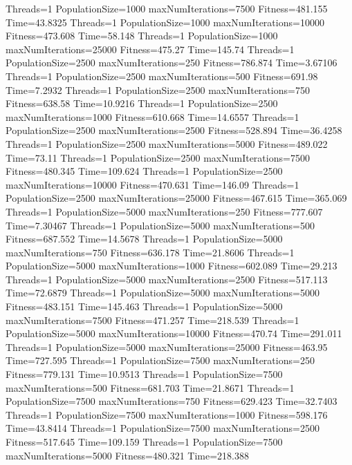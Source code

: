 \documentclass[10pt,letterpaper]{article}
\begin{document}
Threads=1 PopulationSize=1000 maxNumIterations=7500 Fitness=481.155 Time=43.8325
Threads=1 PopulationSize=1000 maxNumIterations=10000 Fitness=473.608 Time=58.148
Threads=1 PopulationSize=1000 maxNumIterations=25000 Fitness=475.27 Time=145.74
Threads=1 PopulationSize=2500 maxNumIterations=250 Fitness=786.874 Time=3.67106
Threads=1 PopulationSize=2500 maxNumIterations=500 Fitness=691.98 Time=7.2932
Threads=1 PopulationSize=2500 maxNumIterations=750 Fitness=638.58 Time=10.9216
Threads=1 PopulationSize=2500 maxNumIterations=1000 Fitness=610.668 Time=14.6557
Threads=1 PopulationSize=2500 maxNumIterations=2500 Fitness=528.894 Time=36.4258
Threads=1 PopulationSize=2500 maxNumIterations=5000 Fitness=489.022 Time=73.11
Threads=1 PopulationSize=2500 maxNumIterations=7500 Fitness=480.345 Time=109.624
Threads=1 PopulationSize=2500 maxNumIterations=10000 Fitness=470.631 Time=146.09
Threads=1 PopulationSize=2500 maxNumIterations=25000 Fitness=467.615 Time=365.069
Threads=1 PopulationSize=5000 maxNumIterations=250 Fitness=777.607 Time=7.30467
Threads=1 PopulationSize=5000 maxNumIterations=500 Fitness=687.552 Time=14.5678
Threads=1 PopulationSize=5000 maxNumIterations=750 Fitness=636.178 Time=21.8606
Threads=1 PopulationSize=5000 maxNumIterations=1000 Fitness=602.089 Time=29.213
Threads=1 PopulationSize=5000 maxNumIterations=2500 Fitness=517.113 Time=72.6879
Threads=1 PopulationSize=5000 maxNumIterations=5000 Fitness=483.151 Time=145.463
Threads=1 PopulationSize=5000 maxNumIterations=7500 Fitness=471.257 Time=218.539
Threads=1 PopulationSize=5000 maxNumIterations=10000 Fitness=470.74 Time=291.011
Threads=1 PopulationSize=5000 maxNumIterations=25000 Fitness=463.95 Time=727.595
Threads=1 PopulationSize=7500 maxNumIterations=250 Fitness=779.131 Time=10.9513
Threads=1 PopulationSize=7500 maxNumIterations=500 Fitness=681.703 Time=21.8671
Threads=1 PopulationSize=7500 maxNumIterations=750 Fitness=629.423 Time=32.7403
Threads=1 PopulationSize=7500 maxNumIterations=1000 Fitness=598.176 Time=43.8414
Threads=1 PopulationSize=7500 maxNumIterations=2500 Fitness=517.645 Time=109.159
Threads=1 PopulationSize=7500 maxNumIterations=5000 Fitness=480.321 Time=218.388
\end{document}
